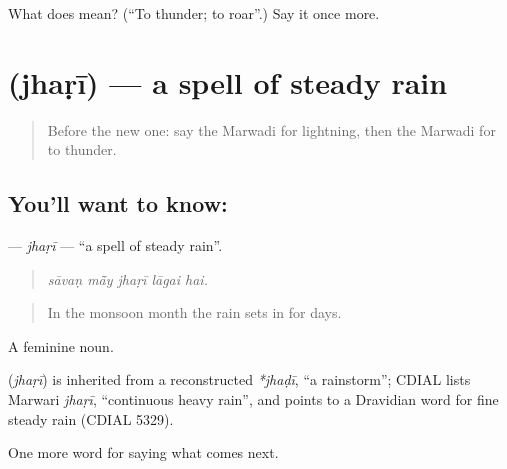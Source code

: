 \begin{tcolorbox}[breakable,colback=teal!4,colframe=teal!35!black,title={Before you move on}]
What does  mean? (\textquotedblleft{}To thunder; to roar\textquotedblright{}.) Say it once more.
\end{tcolorbox}
\section[\texorpdfstring{\mw{झड़ी} (jhaṛī)}{झड़ी (jhaṛī)}]{ (jhaṛī) — a spell of steady rain}

\label{lesson:MW-C221-jhari}



\begin{quote}
Before the new one: say the Marwadi for lightning, then the Marwadi for to thunder.
\end{quote}

\subsection*{You'll want to know: }
\textbf{} — \emph{jhaṛī} — \textquotedblleft{}a spell of steady rain\textquotedblright{}.

\begin{quote}
    
\end{quote}

\begin{quote}
\emph{sāvaṇ mā̃y jhaṛī lāgai hai.}
\end{quote}

\begin{quote}
In the monsoon month the rain sets in for days.
\end{quote}

A feminine noun.

\begin{cousinweb}
\textbf{} (\emph{jhaṛī}) is inherited from a reconstructed \emph{*jhaḍī}, \textquotedblleft{}a rainstorm\textquotedblright{}; CDIAL lists Marwari \emph{jhaṛī}, \textquotedblleft{}continuous heavy rain\textquotedblright{}, and points to a Dravidian word for fine steady rain (CDIAL 5329).
\end{cousinweb}

\begin{grammarlens}[title={What you've built}]
One more word for saying what comes next.
\end{grammarlens}

